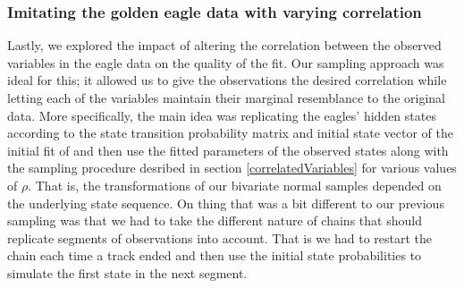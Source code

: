 \subsubsection{Imitating the golden eagle data with varying correlation}\label{eagleImitation}
Lastly, we explored the impact  of altering the correlation between the observed variables in the eagle data on the quality of the fit. Our sampling approach was ideal for this; it allowed us to give the observations the desired correlation while letting each of the variables maintain their marginal resemblance to the original data. More specifically, the main idea was replicating the eagles' hidden  states according to the state transition probability matrix and initial state vector of the initial fit of and then use the fitted parameters of the observed states along with the sampling procedure desribed in section \ref{correlatedVariables} for various values of $\rho$. That is, the transformations of our bivariate normal samples depended on the underlying state sequence. On thing that was a bit different to our previous sampling was that we had to take the different nature of chains that should replicate segments of observations into account. That is we had to restart the chain each time a track ended and then use the initial state probabilities to simulate the first state in the next segment.